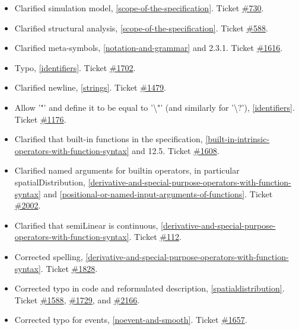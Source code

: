\documentclass[10pt,a4paper]{report}
\begin{document}
\begin{itemize}
\item
  Clarified simulation model, \ref{scope-of-the-specification}. Ticket
  \href{https://trac.modelica.org/Modelica/ticket/730}{\#730}.
\item
  Clarified structural analysis, \ref{scope-of-the-specification}. Ticket
  \href{https://trac.modelica.org/Modelica/ticket/588}{\#588}.
\item
  Clarified meta-symbols, \ref{notation-and-grammar} and 2.3.1. Ticket
  \href{https://trac.modelica.org/Modelica/ticket/1616}{\#1616}.
\item
  Typo, \ref{identifiers}. Ticket
  \href{https://trac.modelica.org/Modelica/ticket/1702}{\#1702}.
\item
  Clarified newline, \ref{strings}. Ticket
  \href{https://trac.modelica.org/Modelica/ticket/1479}{\#1479}.
\item
  Allow '"' and define it to be equal to '\textbackslash{}"' (and
  similarly for '\textbackslash{}?'), \ref{identifiers}. Ticket
  \href{https://trac.modelica.org/Modelica/ticket/1176}{\#1176}.
\item
  Clarified that built-in functions in the specification, \ref{built-in-intrinsic-operators-with-function-syntax}
  and 12.5. Ticket
  \href{https://trac.modelica.org/Modelica/ticket/1608}{\#1608}.
\item
  Clarified named arguments for builtin operators, in particular
  spatialDistribution, \ref{derivative-and-special-purpose-operators-with-function-syntax} and \ref{positional-or-named-input-arguments-of-functions}. Ticket
  \href{https://trac.modelica.org/Modelica/ticket/2002}{\#2002}.
\item
  Clarified that semiLinear is continuous, \ref{derivative-and-special-purpose-operators-with-function-syntax}. Ticket
  \href{https://trac.modelica.org/Modelica/ticket/112}{\#112}.
\item
  Corrected spelling, \ref{derivative-and-special-purpose-operators-with-function-syntax}. Ticket
  \href{https://trac.modelica.org/Modelica/ticket/1828}{\#1828}.
\item
  Corrected typo in code and reformulated description, \ref{spatialdistribution}.
  Ticket \href{https://trac.modelica.org/Modelica/ticket/1588}{\#1588},
  \href{https://trac.modelica.org/Modelica/ticket/1729}{\#1729}, and
  \href{https://trac.modelica.org/Modelica/ticket/2166}{\#2166}.
\item
  Corrected typo for events, \ref{noevent-and-smooth}. Ticket
  \href{https://trac.modelica.org/Modelica/ticket/1657}{\#1657}.

\end{itemize}
\end{document}
